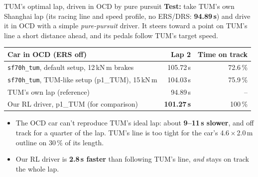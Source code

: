 \documentclass[aspectratio=169,10pt]{beamer}
\begin{document}
\begin{frame}{TUM's optimal lap, driven in OCD by pure pursuit}
  \small
  \textbf{Test:} take TUM's own Shanghai lap (its racing line and speed profile, no ERS/DRS: \textbf{94.89\,s}) and drive it in OCD with a simple \emph{pure-pursuit} driver. It steers toward a point on TUM's line a short distance ahead, and its pedals follow TUM's target speed.
  \medskip

  \centering
  \begin{tabular}{@{}lrr@{}}
    \toprule
    Car in OCD (ERS off) & Lap 2 & Time on track\\
    \midrule
    \texttt{sf70h\_tum}, default setup, 12\,kN\,m brakes & 105.72\,s & 72.6\,\%\\
    \texttt{sf70h\_tum}, TUM-like setup (p1\_TUM), 15\,kN\,m & 104.03\,s & 75.9\,\%\\
    \midrule
    TUM's own lap (reference) & 94.89\,s & --\\
    Our RL driver, p1\_TUM (for comparison) & \textbf{101.27\,s} & 100\,\%\\
    \bottomrule
  \end{tabular}
  \medskip
  \raggedright
  \begin{itemize}
    \item The OCD car can't reproduce TUM's ideal lap: about \textbf{9--11\,s slower}, and off track for a quarter of the lap. TUM's line is too tight for the car's 4.6\,$\times$\,2.0\,m outline on 30\,\% of its length.
    \item Our RL driver is \textbf{2.8\,s faster} than following TUM's line, \emph{and} stays on track the whole lap.
  \end{itemize}
\end{frame}
\end{document}
